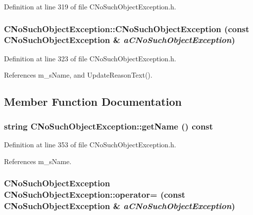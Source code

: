 Definition at line 319 of file CNo\-Such\-Object\-Exception.h.
\subsubsection{\setlength{\rightskip}{0pt plus 5cm}CNo\-Such\-Object\-Exception::CNo\-Such\-Object\-Exception (const CNo\-Such\-Object\-Exception \& {\em a\-CNo\-Such\-Object\-Exception})\hspace{0.3cm}{\tt  [inline]}}\label{classCNoSuchObjectException_a5}




Definition at line 323 of file CNo\-Such\-Object\-Exception.h.

References m\_\-s\-Name, and Update\-Reason\-Text().

\subsection{Member Function Documentation}
\subsubsection{\setlength{\rightskip}{0pt plus 5cm}string CNo\-Such\-Object\-Exception::get\-Name () const\hspace{0.3cm}{\tt  [inline]}}\label{classCNoSuchObjectException_a8}




Definition at line 353 of file CNo\-Such\-Object\-Exception.h.

References m\_\-s\-Name.
\subsubsection{\setlength{\rightskip}{0pt plus 5cm}CNo\-Such\-Object\-Exception CNo\-Such\-Object\-Exception::operator= (const CNo\-Such\-Object\-Exception \& {\em a\-CNo\-Such\-Object\-Exception})\hspace{0.3cm}{\tt  [inline]}}\label{classCNoSuchObjectException_a6}




